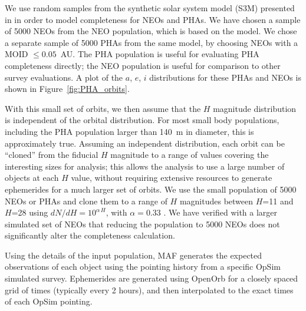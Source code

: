 We use random samples from the synthetic solar system model (S3M) presented in \cite{Grav2011} in order to model completeness for NEOs and PHAs. We have chosen a sample of 5000 NEOs from the \cite{Grav2011} NEO population, which is based on the \cite{Bottke2002} model. We chose a separate sample of 5000 PHAs from the same model, by choosing NEOs with a MOID $\le 0.05$~AU. The PHA population is useful for evaluating PHA completeness directly; the NEO population is useful for comparison to other survey evaluations. A plot of the $a$, $e$, $i$ distributions for these PHAs and NEOs is shown in Figure~\ref{fig:PHA_orbits}.

With this small set of orbits, we then assume that the $H$ magnitude distribution is independent of the orbital distribution. For most small body populations, including the PHA population larger than 140~m in diameter, this is approximately true. Assuming an independent distribution, each orbit can be ``cloned'' from the fiducial $H$ magnitude to a range of values covering the interesting sizes for analysis; this allows the analysis to use a large number of objects at each $H$ value, without requiring extensive resources to generate ephemerides for a much larger set of orbits. We use the small population of 5000 NEOs or PHAs and clone them to a range of $H$ magnitudes between $H$=11 and $H$=28 using $dN/dH = 10^{\alpha\, H}$, with $\alpha=0.33$ \citep{2017Icar..284..114S}. We have verified with a larger simulated set of NEOs that reducing the population 
to 5000 NEOs does not significantly alter the completeness calculation.

Using the details of the input population, MAF generates the expected observations of each object using the pointing history
from a specific OpSim simulated survey. Ephemerides are generated using OpenOrb \citep{OpenOrb2009} for a closely spaced grid of times (typically every 2 hours), and then interpolated to the exact times of each OpSim pointing.


